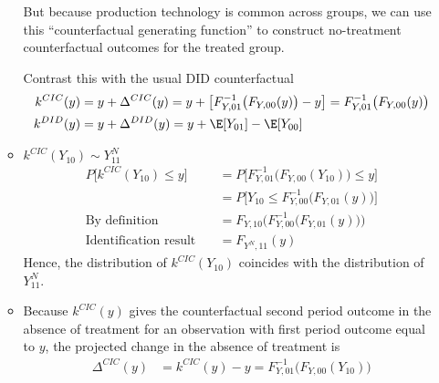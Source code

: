 \documentclass[12pt]{article}
\theoremstyle{plain}
\theoremstyle{definition}
\theoremstyle{remark}
\begin{document}
\begin{itemize}
\begin{itemize}
        But because production technology is common across groups, we
        can use this ``counterfactual generating function'' to construct
        no-treatment counterfactual outcomes for the treated group.


        Contrast this with the usual DID counterfactual
        \begin{align*}
          k^{CIC}(y)
          &=
          y + \Delta^{CIC}(y)
          =
          y + \big[ F_{Y,01}^{-1}\big( F_{Y,00}(y) \big) - y\big]
          =
          F_{Y,01}^{-1}\big(
            F_{Y,00}(y)
          \big)
          \\
          k^{DID}(y)
          &=
          y + \Delta^{DID}(y)
          =
          y + \E[Y_{01}] - \E[Y_{00}]
        \end{align*}


      \item
        $k^{CIC}(Y_{10})\sim Y^N_{11}$
        \begin{align*}
          P\big[
            k^{CIC}(Y_{10})
            \leq y
          \big]
          &=
          P\big[
            F_{Y,01}^{-1}\big(
              F_{Y,00}(Y_{10})
            \big)
            \leq y
          \big]
          \\
          &=
          P\big[
              Y_{10}
            \leq
            F_{Y,00}^{-1}\big(
            F_{Y,01}(y)
            \big)
          \big]
          \\
          \text{By definition}\quad
          &=
          F_{Y,10}
          \big(
            F_{Y,00}^{-1}\big(
            F_{Y,01}(y)
            \big)
          \big)
          \\
          \text{Identification result}\quad
          &=
          F_{Y^N,11}(y)
        \end{align*}
        Hence, the distribution of $k^{CIC}(Y_{10})$ coincides with the
        distribution of $Y^N_{11}$.

      \item Because $k^{CIC}(y)$ gives the counterfactual second period
        outcome in the absence of treatment for an observation with
        first period outcome equal to $y$,
        the projected change in the absence of treatment is
        \begin{align*}
          \Delta^{CIC}(y)
          &=
          k^{CIC}(y)-y
          =
            F_{Y,01}^{-1}\big(
              F_{Y,00}(Y_{10})
            \big)
        \end{align*}


\end{itemize}
\end{itemize}
\end{document}

